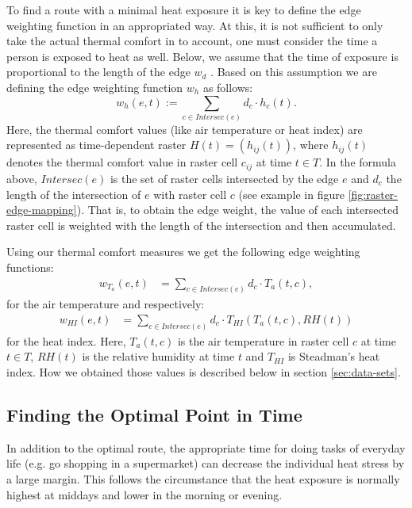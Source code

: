 To find a route with a minimal heat exposure it is key to define the edge weighting function in an appropriated way. At this, it is not sufficient to only take the actual thermal comfort in to account, one must consider the time a person is exposed to heat as well. Below, we assume that the time of exposure is proportional to the length of the edge $w_d$ \parencite[following][]{Hasenfratz2015}. Based on this assumption we are defining the edge weighting function $w_h$ as follows: 
\begin{equation}\label{eq:edge-weight}
w_h(e, t) := \sum_{c \in Intersec(e)} d_c \cdot h_c(t).
\end{equation}
Here, the thermal comfort values (like air temperature or heat index) are represented as time-dependent raster $H(t) = \left(h_{ij}(t)\right)$, where $h_{ij}(t)$ denotes the thermal comfort value in raster cell $c_{ij}$ at time $t \in T$. In the formula above, $Intersec(e)$ is the set of raster cells intersected by the edge $e$ and $d_c$ the length of the intersection of $e$ with raster cell $c$ (see example in figure \ref{fig:raster-edge-mapping}). That is, to obtain the edge weight, the value of each intersected raster cell is weighted with the length of the intersection and then accumulated.

Using our thermal comfort measures we get the following edge weighting functions:
\begin{align}
	\label{eq:edge-weight-temperature}
	w_{T_a}(e,t)& = \sum_{c \in Intersec(e)} d_c \cdot T_a(t, c),
\end{align}
for the air temperature and respectively:
\begin{align}
	\label{eq:edge-weight-heatindex}
	w_{HI}(e,t)& = \sum_{c \in Intersec(e)} d_c \cdot T_{HI}\left(T_a(t, c), RH(t)\right)
\end{align}
for the heat index. Here, $T_a(t,c)$ is the air temperature in raster cell $c$ at time $t \in T$, $RH(t)$ is the relative humidity at time $t$ and $T_{HI}$ is Steadman's heat index. How we obtained those values is described below in section \ref{sec:data-sets}.

 \subsection{Finding the Optimal Point in Time \label{sec:find-optimal-time}}
In addition to the optimal route, the appropriate time for doing tasks of everyday life (e.g. go shopping in a supermarket) can decrease the individual heat stress by a large margin. This follows the circumstance that the heat exposure is normally highest at middays and lower in the morning or evening.
 
